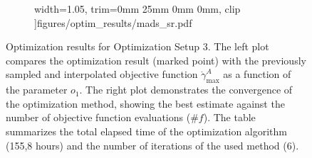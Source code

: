 \begin{figure}[H]
\begin{subfigure}{0.52\textwidth}
		width=1.05\textwidth,
		trim={0mm 25mm 0mm 0mm}, clip
		]{figures/optim_results/mads_sr.pdf}
	\end{subfigure}
	\vspace{2mm}
	\caption{Optimization results for Optimization Setup 3. The left plot compares the optimization result (marked point) with the previously sampled and interpolated objective function $\dot{\gamma}_{\text{max}}^{A}$ as a function of the parameter $o_1$. The right plot demonstrates the convergence of the optimization method, showing the best estimate against the number of objective function evaluations ($\# f$). The table summarizes the total elapsed time of the optimization algorithm (155,8 hours) and the number of iterations of the used method (6).}
\end{figure}
\newpage